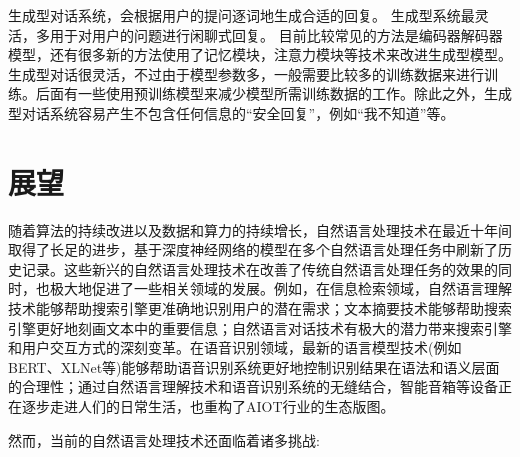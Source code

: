 \documentclass[graybox,envcountchap,sectrefs]{svmono}
\begin{document}
生成型对话系统\citep{sutskever2014sequence,shang2015neural,serban2016building,serban2016hierarchical}，会根据用户的提问逐词地生成合适的回复。
生成型系统最灵活，多用于对用户的问题进行闲聊式回复。
目前比较常见的方法是编码器解码器模型，还有很多新的方法使用了记忆模块，注意力模块等技术来改进生成型模型。
生成型对话很灵活，不过由于模型参数多，一般需要比较多的训练数据来进行训练。后面有一些使用预训练模型来减少模型所需训练数据的工作。除此之外，生成型对话系统容易产生不包含任何信息的``安全回复''，例如``我不知道''等。




\section{展望}

随着算法的持续改进以及数据和算力的持续增长，自然语言处理技术在最近十年间取得了长足的进步，基于深度神经网络的模型在多个自然语言处理任务中刷新了历史记录。这些新兴的自然语言处理技术在改善了传统自然语言处理任务的效果的同时，也极大地促进了一些相关领域的发展。例如，在信息检索领域，自然语言理解技术能够帮助搜索引擎更准确地识别用户的潜在需求；文本摘要技术能够帮助搜索引擎更好地刻画文本中的重要信息；自然语言对话技术有极大的潜力带来搜索引擎和用户交互方式的深刻变革。在语音识别领域，最新的语言模型技术(例如BERT、XLNet等\cite{devlin2018bert, yang2019xlnet, song2019topic})能够帮助语音识别系统更好地控制识别结果在语法和语义层面的合理性；通过自然语言理解技术和语音识别系统的无缝结合，智能音箱等设备正在逐步走进人们的日常生活，也重构了AIOT行业的生态版图。

然而，当前的自然语言处理技术还面临着诸多挑战:
\end{document}
